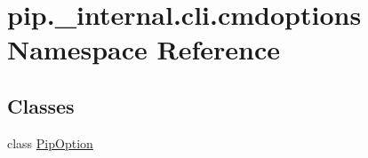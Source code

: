 \hypertarget{namespacepip_1_1__internal_1_1cli_1_1cmdoptions}{}\section{pip.\+\_\+internal.\+cli.\+cmdoptions Namespace Reference}
\label{namespacepip_1_1__internal_1_1cli_1_1cmdoptions}
\subsection*{Classes}
\begin{DoxyCompactItemize}
\item 
class \hyperlink{classpip_1_1__internal_1_1cli_1_1cmdoptions_1_1PipOption}{Pip\+Option}
\end{DoxyCompactItemize}
